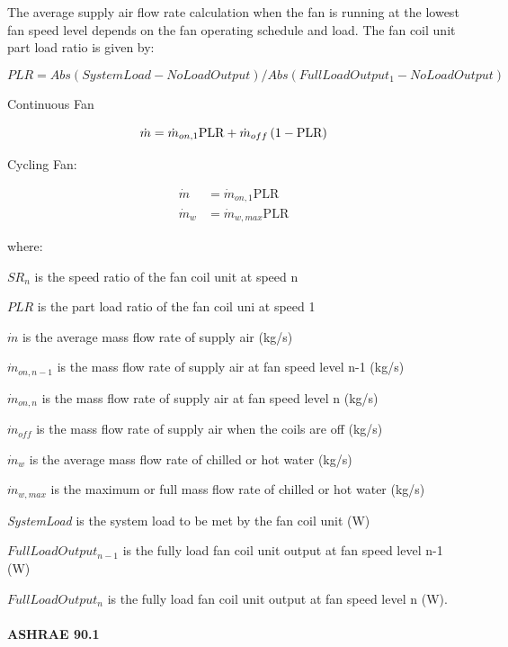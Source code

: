 The average supply air flow rate calculation when the fan is running at the lowest fan speed level depends on the fan operating schedule and load. The fan coil unit part load ratio is given by:

\begin{equation}
{PLR} = Abs({SystemLoad} - {NoLoadOutput}) / Abs({FullLoadOutput_{1}} - {NoLoadOutput})
\end{equation}

Continuous Fan

\begin{equation}
  \dot{m} = \dot{m}_{on, 1} \text{PLR} + \dot{m}_{off} \left(1 - \text{PLR}\right)
\end{equation}

Cycling Fan:

\begin{equation}
  \begin{array}{ll}
    \dot{m}   &= \dot{m}_{on, 1}\text{PLR} \\
    \dot{m}_w &= \dot{m}_{w, max} \text{PLR}
  \end{array}
\end{equation}

where:

$SR_n$ is the speed ratio of the fan coil unit at speed n

$PLR$ is the part load ratio of the fan coil uni at speed 1

$\dot{m}$ is the average mass flow rate of supply air (kg/s)

$\dot{m}_{on, n-1}$ is the mass flow rate of supply air at fan speed level n-1 (kg/s)

$\dot{m}_{on, n}$ is the mass flow rate of supply air at fan speed level n (kg/s)

$\dot{m}_{off}$ is the mass flow rate of supply air when the coils are off (kg/s)

$\dot{m}_{w}$ is the average mass flow rate of chilled or hot water (kg/s)

$\dot{m}_{w, max}$ is the maximum or full mass flow rate of chilled or hot water (kg/s)

\emph{SystemLoad} is the system load to be met by the fan coil unit (W)

$FullLoadOutput_{n-1}$ is the fully load fan coil unit output at fan speed level n-1 (W)

$FullLoadOutput_{n}$ is the fully load fan coil unit output at fan speed level n (W).

\paragraph{ASHRAE 90.1}\label{ashrae-90.1}

